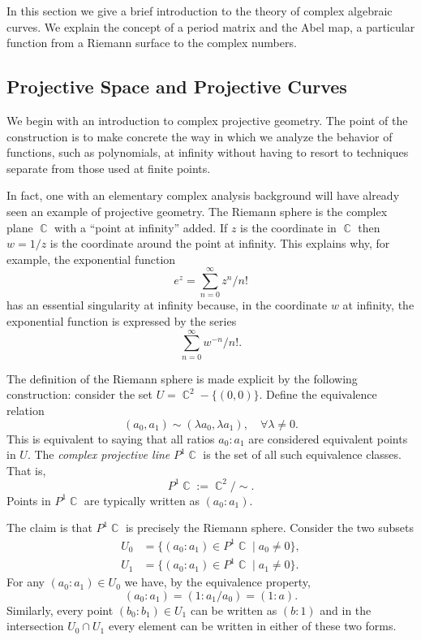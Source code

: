 \documentclass[10pt,twoside]{article}
\theoremstyle{plain}
\theoremstyle{definition}
\numberwithin{equation}{section}
\DeclareMathOperator{\CC}{\mathbb{C}}
\begin{document}
In this section we give a brief introduction to the theory of complex
algebraic curves. We explain the concept of a period matrix and the Abel
map, a particular function from a Riemann surface to the complex
numbers.

\subsection{Projective Space and Projective Curves}

We begin with an introduction to complex projective geometry. The point
of the construction is to make concrete the way in which we analyze the
behavior of functions, such as polynomials, at infinity without having
to resort to techniques separate from those used at finite points.

In fact, one with an elementary complex analysis background will have
already seen an example of projective geometry. The Riemann sphere is
the complex plane $\CC$ with a ``point at infinity'' added. If $z$ is
the coordinate in $\CC$ then $w = 1/z$ is the coordinate around the
point at infinity. This explains why, for example, the exponential
function
\[
    e^z = \sum_{n=0}^\infty z^n / n!
\]
has an essential singularity at infinity because, in the coordinate $w$
at infinity, the exponential function is expressed by the series
\[
    \sum_{n=0}^\infty w^{-n} / n!.
\]

The definition of the Riemann sphere is made explicit by the following
construction: consider the set $U = \CC^2 - \{(0,0)\}$. Define the
equivalence relation
\[
    (a_0, a_1) \sim (\lambda a_0, \lambda a_1),
    \quad \forall \lambda \neq 0.
\]
This is equivalent to saying that all ratios $a_0 : a_1$ are considered
equivalent points in $U$. The {\it complex projective line} $P^1\CC$ is
the set of all such equivalence classes. That is,
\[
    P^1\CC := \CC^2 / \sim.
\]
Points in $P^1\CC$ are typically written as $(a_0 : a_1)$.

The claim is that $P^1\CC$ is precisely the Riemann sphere. Consider the
two subsets
\begin{align*}
    U_0 &= \{ (a_0 : a_1) \in P^1\CC \; | \; a_0 \neq 0 \}, \\
    U_1 &= \{ (a_0 : a_1) \in P^1\CC \; | \; a_1 \neq 0 \}.
\end{align*}
For any $(a_0 : a_1) \in U_0$ we have, by the equivalence property,
\[
    (a_0 : a_1) = (1 : a_1/a_0) = (1 : a).
\]
Similarly, every point $(b_0 : b_1) \in U_1$ can be written as $(b : 1)$
and in the intersection $U_0 \cap U_1$ every element can be written in
either of these two forms.
\end{document}
